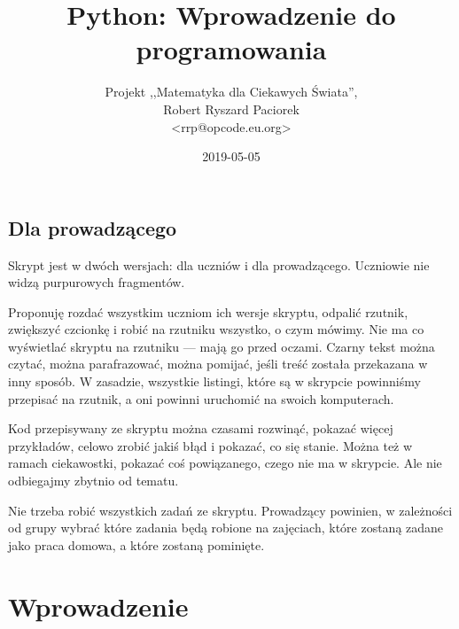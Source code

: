 \documentclass{pdfBooklets}
\title{Python: Wprowadzenie do programowania}
\author{%
	Projekt ,,Matematyka dla Ciekawych Świata'',\\
	Robert Ryszard Paciorek\\\normalsize\ttfamily <rrp@opcode.eu.org>
}
\date  {2019-05-05}
\begin{document}
\maketitle

\begin{teacherOnly}
\section*{Dla prowadzącego}
Skrypt jest w dwóch wersjach: dla uczniów i dla prowadzącego.
Uczniowie nie widzą purpurowych fragmentów.

Proponuję rozdać wszystkim uczniom ich wersje skryptu, odpalić rzutnik, zwiększyć czcionkę i robić
na rzutniku wszystko, o czym mówimy. Nie ma co wyświetlać skryptu na rzutniku --- mają go przed oczami.
Czarny tekst można czytać, można parafrazować, można pomijać, jeśli treść została przekazana w inny sposób.
W zasadzie, wszystkie listingi, które są w skrypcie powinniśmy przepisać na rzutnik, a oni powinni
uruchomić na swoich komputerach.

Kod przepisywany ze skryptu można czasami rozwinąć, pokazać więcej przykładów, celowo zrobić jakiś błąd i pokazać, co się stanie.
Można też w ramach ciekawostki, pokazać coś powiązanego, czego nie ma w skrypcie.
Ale nie odbiegajmy zbytnio od tematu.

Nie trzeba robić wszystkich zadań ze skryptu. Prowadzący powinien, w zależności od grupy wybrać które zadania będą robione na zajęciach,
które zostaną zadane jako praca domowa, a które zostaną pominięte.
\end{teacherOnly}

\section{Wprowadzenie}
\end{document}
